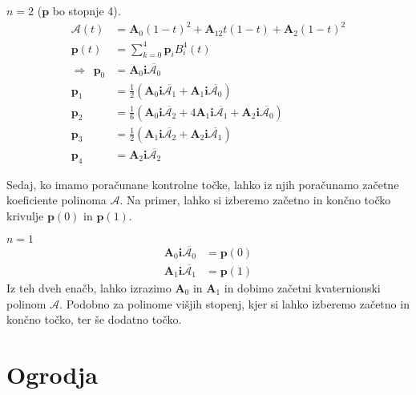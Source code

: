 \documentclass[mat1]{fmfdelo}
\newcommand{\ii}{\boldsymbol i}
\newcommand{\pp}{\boldsymbol p}
\newcommand{\ba}{\boldsymbol A}
\newcommand{\A}{\mathcal A}
\begin{document}
\begin{primer}
$n=2$ ($\pp$ bo stopnje 4).
\begin{equation*}
\begin{split}
\A(t) &= \ba_0(1-t)^2 + \ba_12t(1-t) + \ba_2(1-t)^2\\
\pp(t)& = \sum_{k=0}^4\pp_iB_i^4(t) \\
\Longrightarrow ~~\pp_0 & = \ba_0\ii\overline{\A_0} \\
\pp_1 &= \frac{1}{2}\left( \ba_0\ii\overline{\A_1} + \ba_1\ii\overline{\A_0} \right) \\
\pp_2 &= \frac{1}{6} \left( \ba_0\ii\overline{\A_2} + 4\ba_1\ii\overline{\A_1}+\ba_2\ii\overline{\A_0} \right) \\
\pp_3 &= \frac{1}{2} \left( \ba_1\ii\overline{\A_2}+\ba_2\ii\overline{\A_1} \right) \\
\pp_4 &= \ba_2\ii\overline{\A_2}
\end{split}
\end{equation*}
\end{primer}
\iffalse
Z višanjem stopnje začetnega polinoma, dobimo več prostih parametrov, kar lahko izkoristimo pri konstrukciji krivulje. Več o tem kasneje.
\fi
Sedaj, ko imamo poračunane kontrolne točke, lahko iz njih poračunamo začetne koeficiente polinoma $\A$. Na primer, lahko si izberemo začetno in končno točko krivulje $\pp(0)$ in $\pp(1)$.
\begin{primer}
	$n=1$
	\begin{equation*}
	\begin{split}
		\ba_0\ii\overline{\A_0} &= \pp(0) \\
		\ba_1\ii\overline{\A_1} &= \pp(1)
	\end{split}
\end{equation*}
Iz teh dveh enačb, lahko izrazimo $\ba_0$ in $\ba_1$ in dobimo začetni kvaternionski polinom $\A$. Podobno za polinome višjih stopenj, kjer si lahko izberemo začetno in končno točko, ter še dodatno točko.	
\end{primer}
\section{Ogrodja}
\end{document}
